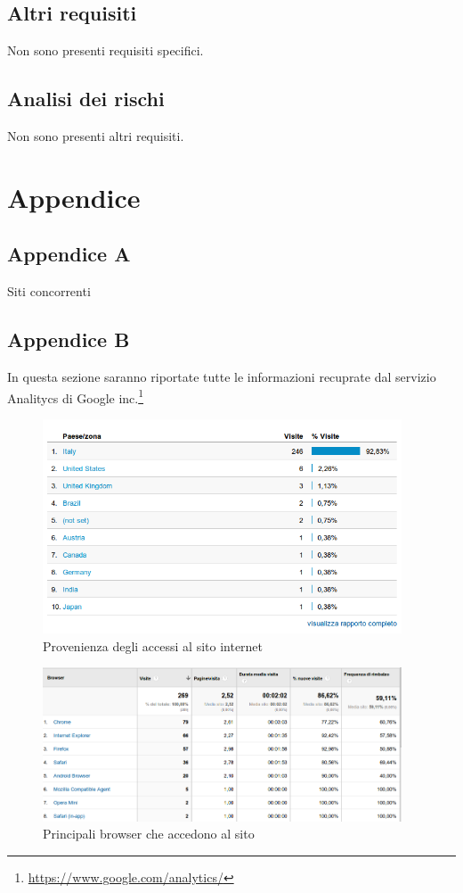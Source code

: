 \documentclass[a4paper,12pt,hidelinks]{report}
\begin{document}
\section{Altri requisiti}
  Non sono presenti requisiti specifici.

\section{Analisi dei rischi}
  Non sono presenti altri requisiti.

\chapter{Appendice}
\section{Appendice A}
Siti concorrenti
\section{Appendice B}
In questa sezione saranno riportate tutte le informazioni recuprate dal servizio Analitycs di Google inc.\footnote{\url{https://www.google.com/analytics/}}
\begin{figure}[h!]%
	\includegraphics[width=0.95\textwidth,keepaspectratio=true]{img/googleAnalyticsPaesi}
	\centering
	\caption{Provenienza degli accessi al sito internet}%
	\label{fig:googleAnalyticsPaesi}%
\end{figure}
\begin{figure}[h!]%
	\includegraphics[width=0.95\textwidth,keepaspectratio=true]{img/googleAnalyticsBrowser}
	\centering
	\caption{Principali browser che accedono al sito}%
	\label{fig:googleAnalyticsBrowser}%
\end{figure}
\newpage
\end{document}
